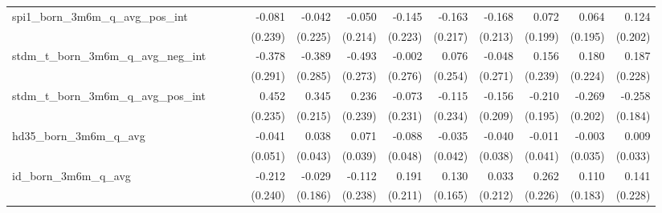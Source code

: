 \begin{tabular}{lrrrrrrrrrrrr}
spi1\_born\_3m6m\_q\_avg\_pos\_int          &              &              &              &       -0.081 &       -0.042 &       -0.050 &       -0.145 &       -0.163 &       -0.168 &        0.072 &        0.064 &        0.124 \\ 
                                            &              &              &              &      (0.239) &      (0.225) &      (0.214) &      (0.223) &      (0.217) &      (0.213) &      (0.199) &      (0.195) &      (0.202) \\ 
stdm\_t\_born\_3m6m\_q\_avg\_neg\_int       &              &              &              &       -0.378 &       -0.389 &       -0.493 &       -0.002 &        0.076 &       -0.048 &        0.156 &        0.180 &        0.187 \\ 
                                            &              &              &              &      (0.291) &      (0.285) &      (0.273) &      (0.276) &      (0.254) &      (0.271) &      (0.239) &      (0.224) &      (0.228) \\ 
stdm\_t\_born\_3m6m\_q\_avg\_pos\_int       &              &              &              &        0.452 &        0.345 &        0.236 &       -0.073 &       -0.115 &       -0.156 &       -0.210 &       -0.269 &       -0.258 \\ 
                                            &              &              &              &      (0.235) &      (0.215) &      (0.239) &      (0.231) &      (0.234) &      (0.209) &      (0.195) &      (0.202) &      (0.184) \\ 
hd35\_born\_3m6m\_q\_avg                    &              &              &              &       -0.041 &        0.038 &        0.071 &       -0.088 &       -0.035 &       -0.040 &       -0.011 &       -0.003 &        0.009 \\ 
                                            &              &              &              &      (0.051) &      (0.043) &      (0.039) &      (0.048) &      (0.042) &      (0.038) &      (0.041) &      (0.035) &      (0.033) \\ 
id\_born\_3m6m\_q\_avg                      &              &              &              &       -0.212 &       -0.029 &       -0.112 &        0.191 &        0.130 &        0.033 &        0.262 &        0.110 &        0.141 \\ 
                                            &              &              &              &      (0.240) &      (0.186) &      (0.238) &      (0.211) &      (0.165) &      (0.212) &      (0.226) &      (0.183) &      (0.228) \\ 

\end{tabular}
